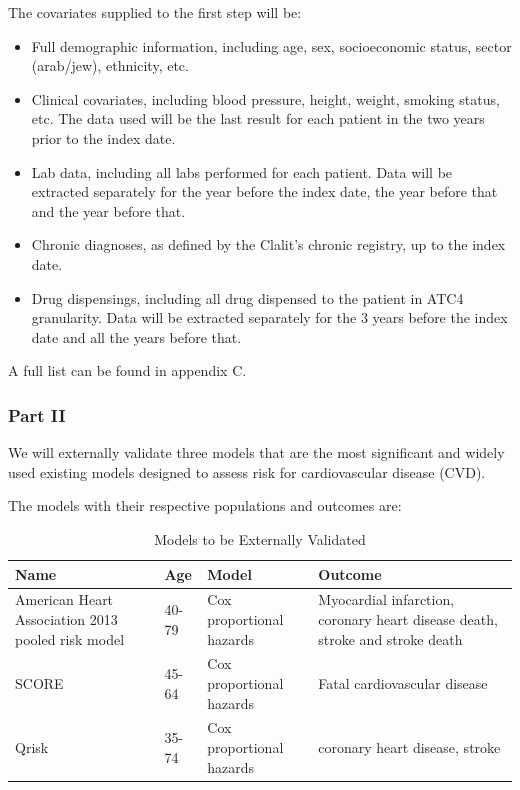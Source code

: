 \documentclass[a4paper,12pt]{article}
\begin{document}
		The covariates supplied to the first step will be: 
		\begin{itemize}
			\item Full demographic information, including age, sex, socioeconomic status, sector (arab/jew), ethnicity, etc.
			\item Clinical covariates, including blood pressure, height, weight, smoking status, etc. The data used will be the last result for each patient in the two years prior to the index date.
			\item Lab data, including all labs performed for each patient. Data will be extracted separately for the year before the index date, the year before that and the year before that.
			\item Chronic diagnoses, as defined by the Clalit's chronic registry\cite{Rennert2001}, up to the index date.
			\item Drug dispensings, including all drug dispensed to the patient in ATC4 granularity\cite{DrugStatisticsMethodology2010}. Data will be extracted separately for the 3 years before the index date and all the years before that.
		\end{itemize}
		A full list can be found in appendix C.
	
		\subsubsection{Part II}
		We will externally validate three models that are the most significant and widely used existing models designed to assess risk for cardiovascular disease (CVD).
		
		The models with their respective populations and outcomes are:
		\begin{table}[H]
		\begin{tabular}{|p{4cm}|p{1cm}|p{3cm}|p{4cm}|}
			\hline
			Name & Age & Model & Outcome \\
			\hline
			American Heart Association 2013 pooled risk model\cite{Goff2014} & 40-79 & Cox proportional hazards & Myocardial infarction, coronary heart disease death, stroke and stroke death \\
			\hline
			SCORE\cite{Conroy2003} & 45-64 & Cox proportional hazards & Fatal cardiovascular disease  \\
			\hline
			Qrisk\cite{Hippisley-Cox2008} & 35-74 & Cox proportional hazards & coronary heart disease, stroke \\
			\hline
		\end{tabular}
		\caption{Models to be Externally Validated}
		\end{table}
	
\end{document}

